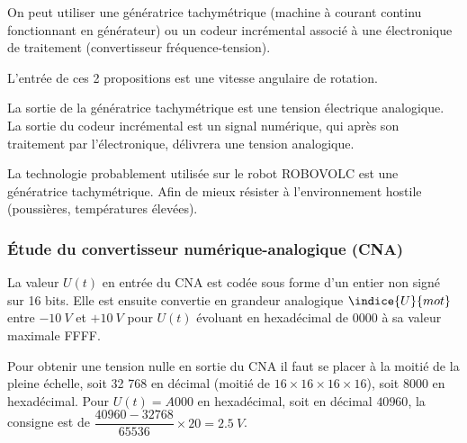 \ifprof
\begin{corrige}
 On peut utiliser une génératrice tachymétrique (machine à courant continu fonctionnant en générateur) ou un codeur incrémental associé à une électronique de traitement (convertisseur fréquence-tension).

L’entrée de ces 2 propositions est une vitesse angulaire de rotation.

La sortie de la génératrice tachymétrique est une tension électrique analogique. La sortie du codeur incrémental est un signal numérique, qui après son traitement par l’électronique, délivrera une tension analogique.

La technologie probablement utilisée sur le robot ROBOVOLC est une génératrice tachymétrique. Afin de mieux résister à l’environnement hostile (poussières, températures élevées).

\end{corrige}
\else
\fi

\subsubsection{Étude du convertisseur numérique-analogique (CNA)}


\ifprof
\else
La valeur $U (t)$ en entrée du CNA est codée sous forme d'un entier non signé sur 16 bits. Elle est
ensuite convertie en grandeur analogique $\indice{U}{mot}$ entre $-\SI{10}{V}$ et $+\SI{10}{V}$ pour $U (t)$ évoluant en
hexadécimal de 0000 à sa valeur maximale FFFF.
\fi

\ifprof
\begin{corrige}
Pour obtenir une tension nulle en sortie du CNA il faut se placer à la moitié de la pleine échelle, soit 32 768 en décimal (moitié de $16\times 16\times  16\times  16$), soit 8000 en hexadécimal.
Pour $U (t) = A000$ en hexadécimal, soit en décimal $40 960$, la consigne est de  $\dfrac{40960-32768}{65536}\times 20= \SI{2,5}{V}$.

\end{corrige}
\else
\fi

